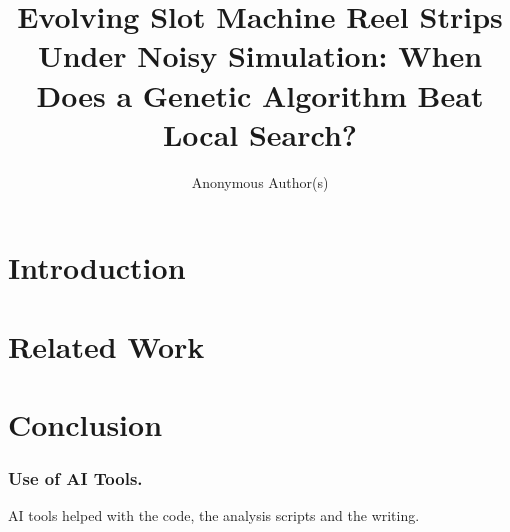 \documentclass[runningheads,a4paper]{llncs}
\begin{document}
\title{Evolving Slot Machine Reel Strips Under Noisy Simulation: When Does a Genetic Algorithm Beat Local Search?}

\author{Anonymous Author(s)}

\maketitle

\begin{abstract}

\end{abstract}

\section{Introduction}
\label{sec:intro}




\section{Related Work}
\label{sec:related}












\section{Conclusion}
\label{sec:conclusion}


\subsubsection*{Use of AI Tools.}
AI tools helped with the code, the analysis scripts and the writing.



\end{document}

